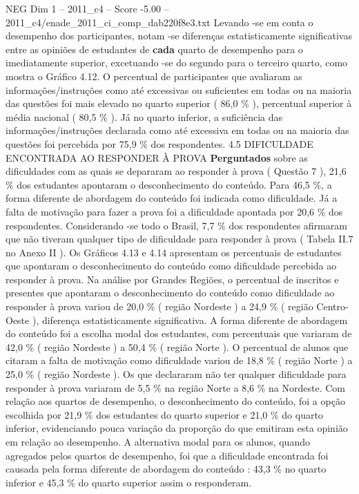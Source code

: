 \begin{textsample}{NEG Dim 1 – 2011\_c4 – Score -5.00 – 2011\_c4/enade\_2011\_ci\_comp\_dab220f8e3.txt}
Levando -se em conta o desempenho dos participantes, notam -se diferenças estatisticamente significativas entre as opiniões de estudantes de \textbf{cada} quarto de desempenho para o imediatamente superior, excetuando -se do segundo para o terceiro quarto, como mostra o Gráfico 4.12.
O percentual de participantes que avaliaram as informações/instruções como até excessivas ou suficientes em todas ou na maioria das questões foi mais elevado no quarto superior ( 86,0 \% ), percentual superior à média nacional ( 80,5 \% ).
Já no quarto inferior, a suficiência das informações/instruções declarada como até excessiva em todas ou na maioria das questões foi percebida por 75,9 \% dos respondentes. 4.5 DIFICULDADE ENCONTRADA AO RESPONDER À PROVA \textbf{Perguntados} sobre as dificuldades com as quais se depararam ao responder à prova ( Questão 7 ), 21,6 \% dos estudantes apontaram o desconhecimento do conteúdo.
Para 46,5 \%, a forma diferente de abordagem do conteúdo foi indicada como dificuldade.
Já a falta de motivação para fazer a prova foi a dificuldade apontada por 20,6 \% dos respondentes.
Considerando -se todo o Brasil, 7,7 \% dos respondentes afirmaram que não tiveram qualquer tipo de dificuldade para responder à prova ( Tabela II.7 no Anexo II ).
Os Gráficos 4.13 e 4.14 apresentam os percentuais de estudantes que apontaram o desconhecimento do conteúdo como dificuldade percebida ao responder à prova.
Na análise por Grandes Regiões, o percentual de inscritos e presentes que apontaram o desconhecimento do conteúdo como dificuldade ao responder à prova variou de 20,0 \% ( região Nordeste ) a 24,9 \% ( região Centro-Oeste ), diferença estatisticamente significativa.
A forma diferente de abordagem do conteúdo foi a escolha modal dos estudantes, com percentuais que variaram de 42,0 \% ( região Nordeste ) a 50,4 \% ( região Norte ).
O percentual de alunos que citaram a falta de motivação como dificuldade variou de 18,8 \% ( região Norte ) a 25,0 \% ( região Nordeste ).
Os que declararam não ter qualquer dificuldade para responder à prova variaram de 5,5 \% na região Norte a 8,6 \% na Nordeste.
Com relação aos quartos de desempenho, o desconhecimento do conteúdo, foi a opção escolhida por 21,9 \% dos estudantes do quarto superior e 21,0 \% do quarto inferior, evidenciando pouca variação da proporção do que emitiram esta opinião em relação ao desempenho.
A alternativa modal para os alunos, quando agregados pelos quartos de desempenho, foi que a dificuldade encontrada foi causada pela forma diferente de abordagem do conteúdo : 43,3 \% no quarto inferior e 45,3 \% do quarto superior assim o responderam.

\end{textsample}
